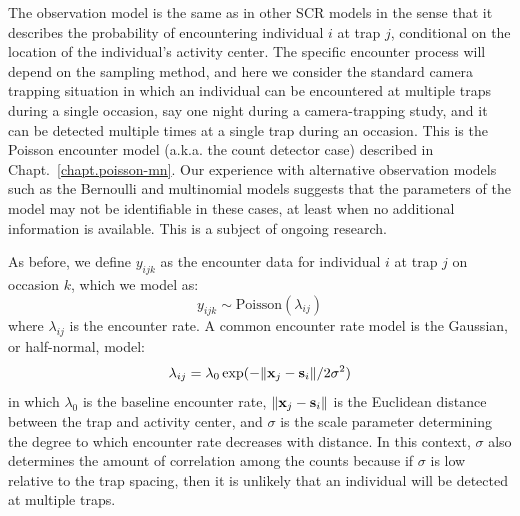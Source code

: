 The observation model is the same as in other SCR models %
in the sense that it describes the probability of encountering individual
$i$ at trap $j$, conditional on the location of the individual's
activity center. The specific encounter process will depend on the
sampling method, and here we consider the standard camera trapping
situation in which an individual can be encountered at multiple traps
during a single occasion, say one night during a camera-trapping
study, and it can be detected multiple times at a single trap during
an occasion. This is the Poisson encounter model (a.k.a. the count
detector case)
described in Chapt.~\ref{chapt.poisson-mn}. Our
experience with alternative observation models such as the
Bernoulli and multinomial models
suggests that the parameters of the model may not be identifiable in
these cases, %
at least
when no additional information is available. This is a subject of
ongoing research.

As before, we define $y_{ijk}$ as the
encounter data for individual $i$ at trap $j$ on occasion $k$, which
we model as:
\begin{equation}
 y_{ijk} \sim \mbox{Poisson}(\lambda_{ij})
\label{eq.latentPoisson}
\end{equation}
where $\lambda_{ij}$ is the encounter rate. A common encounter rate model is the
Gaussian, or half-normal, model:
\[
\lambda_{ij} = \lambda_0 \exp( - \| {\bf x}_j - {\bf s}_i \| / 2\sigma^2)
\]
in which $\lambda_0$ is the baseline encounter rate,
$\| {\bf x}_j - {\bf s}_i \|$ is the Euclidean distance between the
trap and activity center, and $\sigma$ is the
scale parameter determining the degree to which encounter rate decreases with
distance. In this context, $\sigma$ also determines the amount of
correlation among the counts because if $\sigma$ is low relative to
the trap spacing, then it is unlikely that an individual will be
detected at multiple traps.

